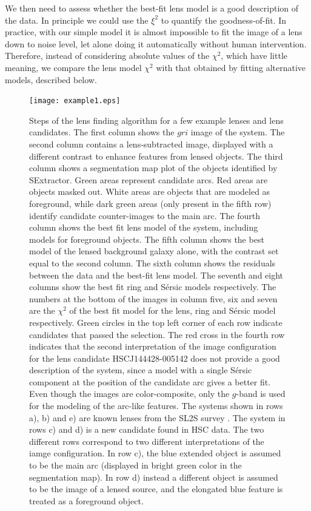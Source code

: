 \documentclass[a4paper,fleqn,usenatbib]{mnras}
\begin{document}
We then need to assess whether the best-fit lens model is a good description of the data. In principle we could use the $\xi^2$ to quantify the goodness-of-fit.
In practice, with our simple model it is almost impossible to fit the image of a lens down to noise level, let alone doing it automatically without human intervention.
Therefore, instead of considering absolute values of the $\chi^2$, which have little meaning, we compare the lens model $\chi^2$ with that obtained by fitting alternative models, described below.
%
\begin{figure}
 \texttt{[image: example1.eps]}
 \label{fig:examples1}
  \caption{Steps of the lens finding algorithm for a few example lenses and lens candidates. 
The first column shows the $gri$ image of the system. 
The second column contains a lens-subtracted image, displayed with a different contrast to enhance features from lensed objects. 
The third column shows a segmentation map plot of the objects identified by SExtractor. Green areas represent candidate arcs. Red areas are objects masked out. White areas are objects that are modeled as foreground, while dark green areas (only present in the fifth row) identify candidate counter-images to the main arc. 
The fourth column shows the best fit lens model of the system, including models for foreground objects. 
The fifth column shows the best model of the lensed background galaxy alone, with the contrast set equal to the second column. 
The sixth column shows the residuals between the data and the best-fit lens model.
The seventh and eight columns show the best fit ring and S\'{e}rsic models respectively. 
The numbers at the bottom of the images in column five, six and seven are the $\chi^2$ of the best fit model for the lens, ring and S\'{e}rsic model respectively.
Green circles in the top left corner of each row indicate candidates that passed the selection.
The red cross in the fourth row indicates that the second interpretation of the image configuration for the lens candidate HSCJ144428-005142 does not provide a good description of the system, since a model with a single S\'{e}rsic component at the position of the candidate arc gives a better fit.
Even though the images are color-composite, only the $g$-band is used for the modeling of the arc-like features.
The systems shown in rows a), b) and e) are known lenses from the SL2S survey \citep{Mor++12, Son++13a}. The system in rows c) and d) is a new candidate found in HSC data. The two different rows correspond to two different interpretations of the iamge configuration. In row c), the blue extended object is assumed to be the main arc (displayed in bright green color in the segmentation map). In row d) instead a different object is assumed to be the image of a lensed source, and the elongated blue feature is treated as a foreground object.
}
\end{figure}
%
\end{document}
